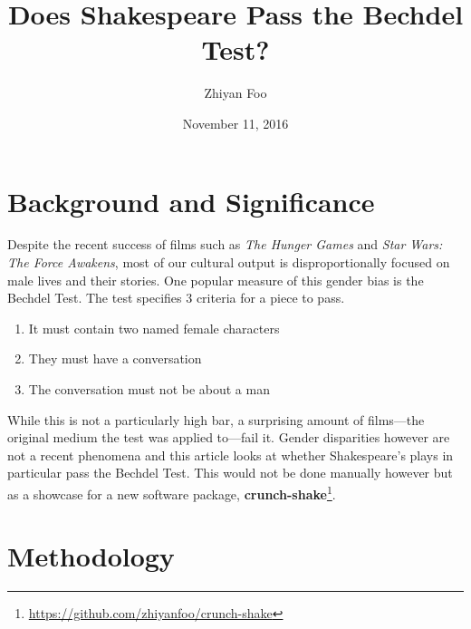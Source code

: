 \documentclass[12pt]{article}
\begin{document}
\title{Does Shakespeare Pass the Bechdel Test?}
\date{November 11, 2016}
\author{Zhiyan Foo}
\maketitle

\section{Background and Significance}
\label{sec:background_and_significance}

Despite the recent success of films such as \emph{The Hunger Games} and \emph{Star
Wars: The Force Awakens}, most of our cultural output is disproportionally
focused on male lives and their stories. One popular measure of this gender
bias is the Bechdel Test. The test specifies 3 criteria for a piece to pass. 
\begin{enumerate}  
\item It must contain two named female characters
\item They must have a conversation
\item The conversation must not be about a man
\end{enumerate}
While this is not a particularly high bar, a surprising amount of films---the
original medium the test was applied to---fail it. Gender disparities however
are not a recent phenomena and this article looks at whether Shakespeare's
plays in particular pass the Bechdel Test. This would not be done manually
however but as a showcase for a new software package,
\textbf{crunch-shake}\footnote{\url{https://github.com/zhiyanfoo/crunch-shake}}.

\section{Methodology}
\label{sec:methodology}
\end{document}
